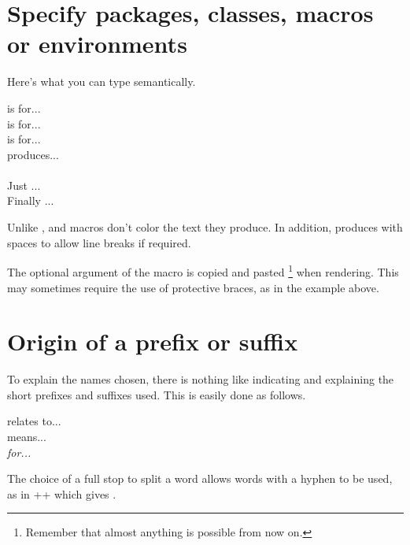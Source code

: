 \documentclass[10pt, a4paper]{tutodoc}
\begin{document}
\section{Specify packages, classes, macros or environments}

Here's what you can type semantically.


\begin{tdoclatex}[sbs]
 is for...              \\
 is for...           \\
 is for...           \\
 produces...                \\
            \\
Just ...                   \\
Finally ...
\end{tdoclatex}


\begin{tdocrem}
	Unlike ,  and  macros don't color the text they produce.
    In addition,  produces  with spaces to allow line breaks if required.
\end{tdocrem}


\begin{tdocwarn}
	The optional argument of the  macro is copied and pasted
    \footnote{
        Remember that almost anything is possible from now on.
    }
    when rendering. This may sometimes require the use of protective braces, as in the example above.
\end{tdocwarn}



\section{Origin of a prefix or suffix}

To explain the names chosen, there is nothing like indicating and explaining the short prefixes and suffixes used. This is easily done as follows.


\begin{tdoclatex}[sbs]
 relates to...      \\
 means...   \\
\emph{ for...}
\end{tdoclatex}


\begin{tdocrem}
    The choice of a full stop to split a word allows words with a hyphen to be used, as in \tdocinlatex++ which gives .
\end{tdocrem}
\end{document}
